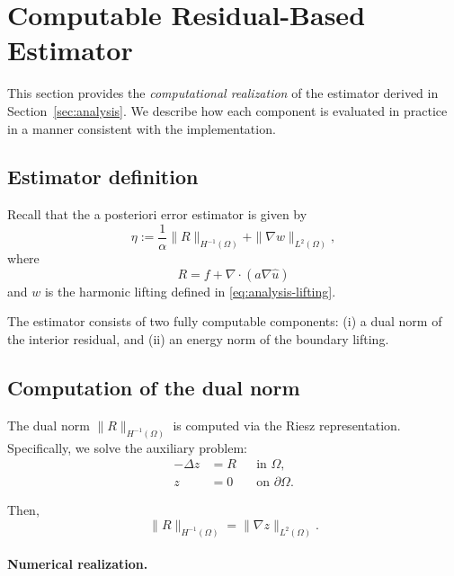 \section{Computable Residual-Based Estimator}\label{sec:estimator}

This section provides the \emph{computational realization} of the estimator
derived in Section~\ref{sec:analysis}. We describe how each component is
evaluated in practice in a manner consistent with the implementation.

\subsection{Estimator definition}

Recall that the a posteriori error estimator is given by
\begin{equation}\label{eq:estimator-final}
\eta :=
\frac{1}{\alpha}\|R\|_{H^{-1}(\Omega)}
+
\|\nabla w\|_{L^2(\Omega)},
\end{equation}
where
\[
R = f + \nabla \cdot (a \nabla \hat{u})
\]
and $w$ is the harmonic lifting defined in
\eqref{eq:analysis-lifting}.

The estimator consists of two fully computable components:
(i) a dual norm of the interior residual, and
(ii) an energy norm of the boundary lifting.

\subsection{Computation of the dual norm}

The dual norm $\|R\|_{H^{-1}(\Omega)}$ is computed via the Riesz
representation. Specifically, we solve the auxiliary problem:
\begin{equation}\label{eq:dual-problem}
\begin{aligned}
- \Delta z &= R && \text{in } \Omega,\\
z &= 0 && \text{on } \partial\Omega.
\end{aligned}
\end{equation}

Then,
\begin{equation}\label{eq:dual-norm}
\|R\|_{H^{-1}(\Omega)} = \|\nabla z\|_{L^2(\Omega)}.
\end{equation}

\paragraph{Numerical realization.}

